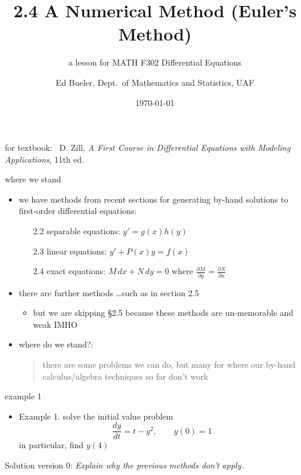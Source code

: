 \documentclass{beamer}
\title{2.4 A Numerical Method (Euler's Method)}
\subtitle{a lesson for MATH F302 Differential Equations}
\author{Ed Bueler, Dept.~of Mathematics and Statistics, UAF}
\date{\tiny \today}
\begin{document}

\begin{frame}
\titlepage

\centerline{\tiny for textbook: \, D. Zill, \emph{A First Course in Differential Equations with Modeling Applications}, 11th ed.}
\end{frame}



\begin{frame}{where we stand}

\begin{itemize}
\item we have methods from recent sections for generating by-hand solutions to first-order differential equations:
    \begin{itemize}
    \item[2.2] separable equations: $y'=g(x)h(y)$
    \item[2.3] linear equations: $y'+P(x)y=f(x)$
    \item[2.4] exact equations: $M\,dx + N\,dy=0$ where $\frac{\partial M}{\partial y} = \frac{\partial N}{\partial x}$
    \end{itemize}
\item there are further methods \dots such as in section 2.5
    \begin{itemize}
    \item but \alert{we are skipping \S 2.5} because these methods are un-memorable and weak IMHO
    \end{itemize}

\bigskip
\item where do we stand?:
\begin{quote}
there are some problems we can do, but many for where our by-hand calculus/algebra techniques so far \alert{don't} work
\end{quote}
\end{itemize}
\end{frame}


\begin{frame}{example 1}

\begin{itemize}
\item Example 1.  solve the initial value problem
    $$\frac{dy}{dt} = t-y^2, \qquad y(0)=1$$
in particular, find $y(4)$
\end{itemize}

\medskip
Solution version 0: \emph{Explain why the previous methods don't apply.}

\vspace{50mm}
\end{frame}
\end{document}
